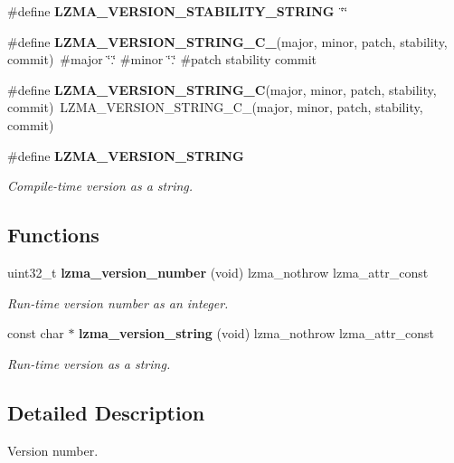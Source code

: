 \begin{DoxyCompactItemize}
\mbox{\label{version_8h_a55a97e55fedce2c148796047ddc88c96}} 
\#define {\bfseries L\+Z\+M\+A\+\_\+\+V\+E\+R\+S\+I\+O\+N\+\_\+\+S\+T\+A\+B\+I\+L\+I\+T\+Y\+\_\+\+S\+T\+R\+I\+NG}~\char`\"{}\char`\"{}
\item 
\mbox{\label{version_8h_a0b89024f7a04da9b754abee2afe6df23}} 
\#define {\bfseries L\+Z\+M\+A\+\_\+\+V\+E\+R\+S\+I\+O\+N\+\_\+\+S\+T\+R\+I\+N\+G\+\_\+\+C\+\_\+}(major,  minor,  patch,  stability,  commit)~\#major \char`\"{}.\char`\"{} \#minor \char`\"{}.\char`\"{} \#patch stability commit
\item 
\mbox{\label{version_8h_ad5614eaf4c2e9408a99bc2137c65ed17}} 
\#define {\bfseries L\+Z\+M\+A\+\_\+\+V\+E\+R\+S\+I\+O\+N\+\_\+\+S\+T\+R\+I\+N\+G\+\_\+C}(major,  minor,  patch,  stability,  commit)~L\+Z\+M\+A\+\_\+\+V\+E\+R\+S\+I\+O\+N\+\_\+\+S\+T\+R\+I\+N\+G\+\_\+\+C\+\_\+(major, minor, patch, stability, commit)
\item 
\#define \textbf{ L\+Z\+M\+A\+\_\+\+V\+E\+R\+S\+I\+O\+N\+\_\+\+S\+T\+R\+I\+NG}
\begin{DoxyCompactList}\small\item\em Compile-\/time version as a string. \end{DoxyCompactList}\end{DoxyCompactItemize}
\subsection*{Functions}
\begin{DoxyCompactItemize}
\item 
uint32\+\_\+t \textbf{ lzma\+\_\+version\+\_\+number} (void) lzma\+\_\+nothrow lzma\+\_\+attr\+\_\+const
\begin{DoxyCompactList}\small\item\em Run-\/time version number as an integer. \end{DoxyCompactList}\item 
const char $\ast$ \textbf{ lzma\+\_\+version\+\_\+string} (void) lzma\+\_\+nothrow lzma\+\_\+attr\+\_\+const
\begin{DoxyCompactList}\small\item\em Run-\/time version as a string. \end{DoxyCompactList}\end{DoxyCompactItemize}


\subsection{Detailed Description}
Version number. 



